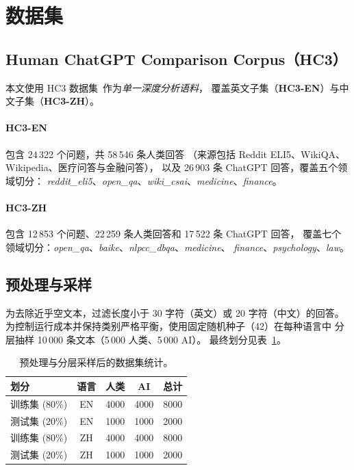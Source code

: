 \documentclass[sigconf]{acmart}
\begin{document}
\section{数据集}

\subsection{Human ChatGPT Comparison Corpus（HC3）}

本文使用 HC3 数据集~\cite{guo2023hc3}作为\emph{单一深度分析语料}，
覆盖英文子集（\textbf{HC3-EN}）与中文子集（\textbf{HC3-ZH}）。

\paragraph{HC3-EN}包含 24\,322 个问题，共 58\,546 条人类回答
（来源包括 Reddit ELI5、WikiQA、Wikipedia、医疗问答与金融问答），
以及 26\,903 条 ChatGPT 回答，覆盖五个领域切分：
\textit{reddit\_eli5}、\textit{open\_qa}、\textit{wiki\_csai}、\textit{medicine}、\textit{finance}。

\paragraph{HC3-ZH}包含 12\,853 个问题、22\,259 条人类回答和 17\,522 条 ChatGPT 回答，
覆盖七个领域切分：\textit{open\_qa}、\textit{baike}、\textit{nlpcc\_dbqa}、\textit{medicine}、
\textit{finance}、\textit{psychology}、\textit{law}。

\subsection{预处理与采样}

为去除近乎空文本，过滤长度小于 30 字符（英文）或 20 字符（中文）的回答。
为控制运行成本并保持类别严格平衡，使用固定随机种子（42）在每种语言中
分层抽样 10\,000 条文本（5\,000 人类、5\,000 AI）。
最终划分见表~\ref{tab:dataset}。

\begin{table}[h]
\centering
\caption{预处理与分层采样后的数据集统计。}
\label{tab:dataset}
\small
\begin{tabular}{lcccc}
\toprule
\textbf{划分} & \textbf{语言} & \textbf{人类} & \textbf{AI} & \textbf{总计} \\
\midrule
训练集 (80\%) & EN & 4000 & 4000 & 8000 \\
测试集 (20\%) & EN & 1000 & 1000 & 2000 \\
训练集 (80\%) & ZH & 4000 & 4000 & 8000 \\
测试集 (20\%) & ZH & 1000 & 1000 & 2000 \\
\bottomrule
\end{tabular}
\end{table}
\end{document}
